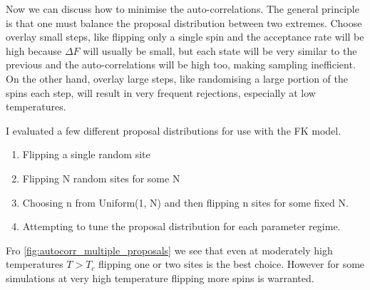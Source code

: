 Now we can discuss how to minimise the auto-correlations. The general principle is that one must balance the proposal distribution between two extremes. Choose overlay small steps, like flipping only a single spin and the acceptance rate will be high because \(\Delta F\) will usually be small, but each state will be very similar to the previous and the auto-correlations will be high too, making sampling inefficient. On the other hand, overlay large steps, like randomising a large portion of the spins each step, will result in very frequent rejections, especially at low temperatures.

I evaluated a few different proposal distributions for use with the FK model.

\begin{enumerate}
\def\labelenumi{\arabic{enumi}.}
\tightlist
\item
  Flipping a single random site
\item
  Flipping N random sites for some N
\item
  Choosing n from Uniform(1, N) and then flipping n sites for some fixed N.
\item
  Attempting to tune the proposal distribution for each parameter regime.
\end{enumerate}

Fro \cref{fig:autocorr_multiple_proposals} we see that even at moderately high temperatures \(T > T_c\) flipping one or two sites is the best choice. However for some simulations at very high temperature flipping more spins is warranted.
